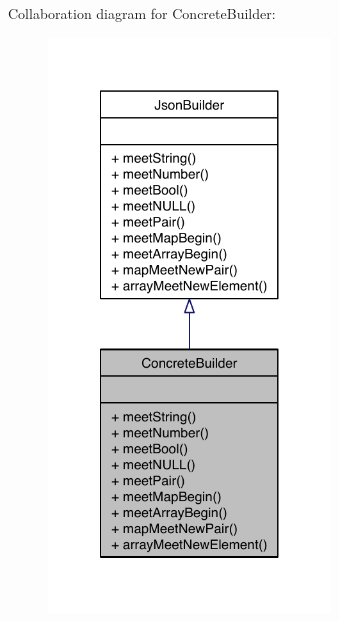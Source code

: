 Collaboration diagram for Concrete\-Builder\-:\nopagebreak
\begin{figure}[H]
\begin{center}
\leavevmode
\includegraphics[width=212pt]{class_concrete_builder__coll__graph}
\end{center}
\end{figure}
